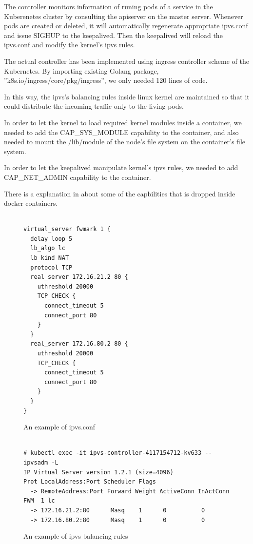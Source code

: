 The controller monitors information of runing pods of a service in the Kuberenetes cluster by consulting the apiserver on the master server.
Whenever pods are created or deleted, it will automatically regenerate appropriate ipvs.conf and issue SIGHUP to the keepalived.
Then the keepalived will reload the ipvs.conf and modify the kernel's ipvs rules.  

The actual controller\cite{ktaka_ccmp_2017_826894} has been implemented using ingress controller\cite{K8sIngress2017} scheme of the Kubernetes.
By importing existing Golang package, ”k8s.io/ingress/core/pkg/ingress”,
we only needed 120 lines of code.  

In this way, the ipvs's balancing rules inside linux kernel are maintained so that it could distribute the incoming traffic only to the living pods.

In order to let the kernel to load required kernel modules inside a container, 
we needed to add the CAP\_SYS\_MODULE capability to the container, and also needed to mount the /lib/module of the node's file system 
on the container's file system.   

In order to let the keepalived manipulate kernel's ipvs rules, 
we needed to add CAP\_NET\_ADMIN capability to the container.

There is a explanation in \cite{mp2016enhancing} about some of the capbilities that is dropped inside docker containers.

\begin{figure}
\begin{minipage}{0.8\columnwidth}
\begin{verbatim}

virtual_server fwmark 1 {
  delay_loop 5
  lb_algo lc
  lb_kind NAT
  protocol TCP
  real_server 172.16.21.2 80 {
    uthreshold 20000
    TCP_CHECK {
      connect_timeout 5
      connect_port 80
    }
  }
  real_server 172.16.80.2 80 {
    uthreshold 20000
    TCP_CHECK {
      connect_timeout 5
      connect_port 80
    }
  }
}

\end{verbatim}
\end{minipage}
\caption{An example of ipvs.conf}
\label{fig:ipvs.conf}
\end{figure}

\begin{figure}
\begin{minipage}{\columnwidth}
\small
\begin{verbatim}

# kubectl exec -it ipvs-controller-4117154712-kv633 -- ipvsadm -L
IP Virtual Server version 1.2.1 (size=4096)
Prot LocalAddress:Port Scheduler Flags
  -> RemoteAddress:Port Forward Weight ActiveConn InActConn
FWM  1 lc
  -> 172.16.21.2:80      Masq    1      0          0         
  -> 172.16.80.2:80      Masq    1      0          0

\end{verbatim}
\end{minipage}
\caption{An example of ipvs balancing rules}
\label{fig:ipvs rule}
\end{figure}

